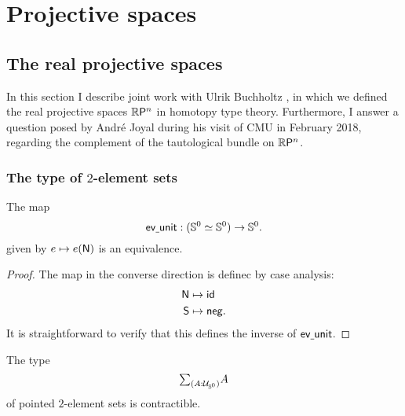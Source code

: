 \chapter{Projective spaces}

\section{The real projective spaces}
In this section I describe joint work with Ulrik Buchholtz \cite{realprojective}, in which we defined the real projective spaces $\mathbb{R}\mathsf{P}^{n}$ in homotopy type theory. Furthermore, I answer a question posed by André Joyal during his visit of CMU in February 2018, regarding the complement of the tautological bundle on $\mathbb{R}\mathsf{P}^{n}$.

\subsection{The type of $2$-element sets}

\begin{lem}\label{lem:isequiv_evunit}
The map
\begin{equation*}
\evunit : (\eqv{\sphere{0}}{\sphere{0}})\to \sphere{0}.
\end{equation*}
given by $e\mapsto e(\mathsf{N})$ is an equivalence. 
\end{lem}

\begin{proof}
The map in the converse direction is definec by case analysis:
\begin{align*}
\mathsf{N} & \mapsto \mathsf{id}_{} \\
\mathsf{S} & \mapsto \mathsf{neg}.
\end{align*}
It is straightforward to verify that this defines the inverse of $\mathsf{ev\underline{\ }{}unit}$.
\end{proof}

\begin{thm}\label{thm:ptd_2elt_sets}
The type
\begin{equation*}
\sm{A:\UU_{\sphere{0}}}A
\end{equation*}
of pointed $2$\nobreakdash-element sets is contractible.
\end{thm}

